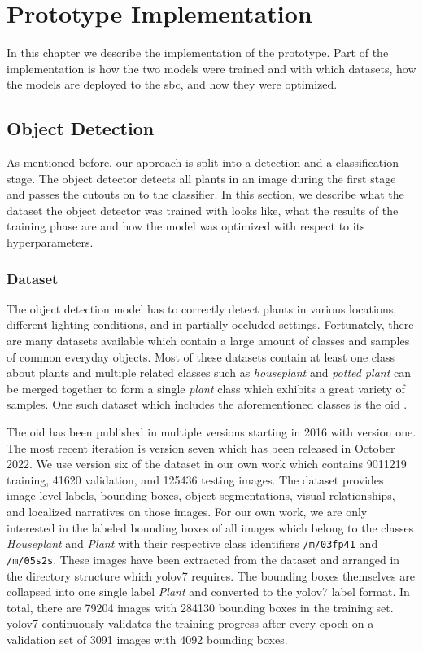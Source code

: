 \documentclass[draft,final]{vutinfth} %
\begin{document}
\chapter{Prototype Implementation}
\label{chap:implementation}

In this chapter we describe the implementation of the prototype. Part
of the implementation is how the two models were trained and with
which datasets, how the models are deployed to the \gls{sbc}, and how
they were optimized.

\section{Object Detection}
\label{sec:development-detection}

As mentioned before, our approach is split into a detection and a
classification stage. The object detector detects all plants in an
image during the first stage and passes the cutouts on to the
classifier. In this section, we describe what the dataset the object
detector was trained with looks like, what the results of the training
phase are and how the model was optimized with respect to its
hyperparameters.

\subsection{Dataset}
\label{ssec:obj-train-dataset}

The object detection model has to correctly detect plants in various
locations, different lighting conditions, and in partially occluded
settings. Fortunately, there are many datasets available which
contain a large amount of classes and samples of common everyday
objects. Most of these datasets contain at least one class about
plants and multiple related classes such as \emph{houseplant} and
\emph{potted plant} can be merged together to form a single
\emph{plant} class which exhibits a great variety of samples. One such
dataset which includes the aforementioned classes is the \gls{oid}
\cite{kuznetsova2020,krasin2017}.

The \gls{oid} has been published in multiple versions starting in 2016
with version one. The most recent iteration is version seven which has
been released in October 2022. We use version six of the dataset in
our own work which contains \num{9011219} training, \num{41620}
validation, and \num{125436} testing images. The dataset provides
image-level labels, bounding boxes, object segmentations, visual
relationships, and localized narratives on those images. For our own
work, we are only interested in the labeled bounding boxes of all
images which belong to the classes \emph{Houseplant} and \emph{Plant}
with their respective class identifiers \texttt{/m/03fp41} and
\texttt{/m/05s2s}. These images have been extracted from the dataset
and arranged in the directory structure which \gls{yolo}v7
requires. The bounding boxes themselves are collapsed into one single
label \emph{Plant} and converted to the \gls{yolo}v7 label format. In
total, there are \num{79204} images with \num{284130} bounding boxes
in the training set. \gls{yolo}v7 continuously validates the training
progress after every epoch on a validation set of \num{3091} images
with \num{4092} bounding boxes.
\end{document}
